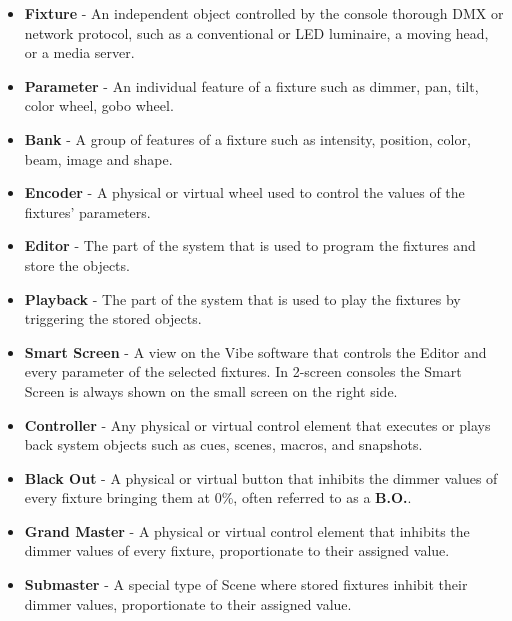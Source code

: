 \documentclass[
]{article}
\providecommand{\tightlist}{%
  \setlength{\itemsep}{0pt}\setlength{\parskip}{0pt}}
\begin{document}
\begin{itemize}
  \begin{itemize}
  \tightlist
  \item
    0 = Fixtures, (Default, includes all sets)
  \item
    1 = Channels (Conventional fixtures)
  \item
    2 = Spots (Automated heads and mirrors)
  \item
    3 = Matrix (LED pixel-based fixtures)
  \item
    4 = Servers (Video servers)
  \item
    5 ⟶ 1000 = User defined sets
  \end{itemize}
\item
  \textbf{Fixture} - An independent object controlled by the console thorough DMX or network protocol, such as a conventional or LED luminaire, a moving head, or a media server.
\item
  \textbf{Parameter} - An individual feature of a fixture such as dimmer, pan, tilt, color wheel, gobo wheel.
\item
  \textbf{Bank} - A group of features of a fixture such as intensity, position, color, beam, image and shape.
\item
  \textbf{Encoder} - A physical or virtual wheel used to control the values of the fixtures' parameters.
\item
  \textbf{Editor} - The part of the system that is used to program the fixtures and store the objects.
\item
  \textbf{Playback} - The part of the system that is used to play the fixtures by triggering the stored objects.
\item
  \textbf{Smart Screen} - A view on the Vibe software that controls the Editor and every parameter of the selected fixtures. In 2-screen consoles the Smart Screen is always shown on the small screen on the right side.
\item
  \textbf{Controller} - Any physical or virtual control element that executes or plays back system objects such as cues, scenes, macros, and snapshots.
\item
  \textbf{Black Out} - A physical or virtual button that inhibits the dimmer values of every fixture bringing them at 0\%, often referred to as a \textbf{B.O.}.
\item
  \textbf{Grand Master} - A physical or virtual control element that inhibits the dimmer values of every fixture, proportionate to their assigned value.
\item
  \textbf{Submaster} - A special type of Scene where stored fixtures inhibit their dimmer values, proportionate to their assigned value.

\end{itemize}
\end{document}
